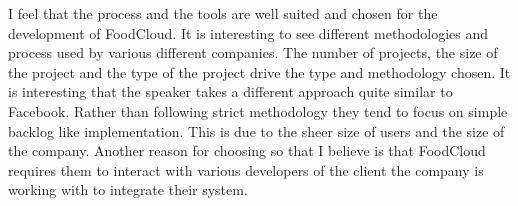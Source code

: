 I feel that the process and the tools are well suited and chosen for the development of FoodCloud. It is interesting to see different methodologies and process used by various different companies. The number of projects, the size of the project and the type of the project drive the type and methodology chosen. It is interesting that the speaker takes a different approach quite similar to Facebook. Rather than following strict methodology they tend to focus on simple backlog like implementation. This is due to the sheer size of users and the size of the company. Another reason for choosing so that I believe is that FoodCloud requires them to interact with various developers of the client the company is working with to integrate their system.
